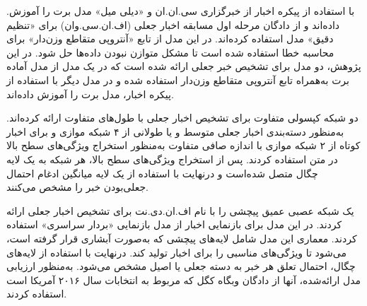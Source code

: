 \citet{jwa2019exbake} .با استفاده از پیکره اخبار از خبرگزاری سی.ان.ان و  «دیلی میل» مدل برت را آموزش داده‌اند و از دادگان مرحله اول مسابقه اخبار جعلی (اف.ان.سی.وان) برای «تنظیم دقیق» مدل استفاده کرده‌اند. در این مدل از تابع «آنتروپی متقاطع وزن‌دار» برای محاسبه خطا استفاده شده‌ است تا مشکل متوازن نبودن داده‌ها حل شود. در این پژوهش، دو مدل برای تشخیص خبر جعلی ارائه شده ‌است که در یک مدل از مدل آماده برت به‌همراه تابع آنتروپی متقاطع وزن‌دار استفاده شده و در مدل دیگر با استفاده از پیکره اخبار، مدل برت را آموزش داده‌اند. %

\cite{goldani2020detecting} دو شبکه کپسولی متفاوت برای تشخیص اخبار جعلی با طول‌های متفاوت ارائه کرده‌اند. به‌منظور دسته‌بندی اخبار جعلی متوسط و یا طولانی از ۴ شبکه موازی و برای اخبار کوتاه از ۲ شبکه موازی با اندازه صافی  متفاوت به‌منظور استخراج ویژگی‌های سطح بالا در متن استفاده کردند. پس از استخراج ویژگی‌های سطح بالا، هر شبکه به یک لایه چگال متصل شده‌است و درنهایت با استفاده از یک لایه میانگین ادغام احتمال جعلی‌بودن خبر را مشخص می‌کنند. %

\citet{kaliyar2020fndnet} یک شبکه عصبی عمیق پیچشی را با نام اف.ان.دی.نت برای تشخیص اخبار جعلی ارائه کردند. در این مدل برای بازنمایی اخبار از مدل بازنمایی «بردار سراسری»  \citep{pennington2014glove} استفاده کردند. معماری این مدل شامل لایه‌های پیچشی که به‌صورت آبشاری قرار گرفته‌ است، می‌شود‌ تا ویژگی‌های مناسبی را برای اخبار تولید کند. درنهایت با استفاده از لایه‌های چگال، احتمال تعلق هر خبر به دسته جعلی یا اصیل مشخص می‌شود. به‌منظور ارزیابی مدل ارائه‌شده، آنها از دادگان وبگاه کگل که مربوط به انتخابات سال ۲۰۱۶ آمریکا است استفاده کردند. %
 
